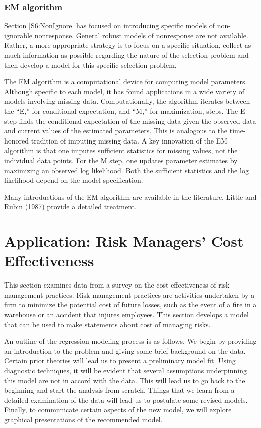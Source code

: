 \subsubsection*{EM algorithm}

Section \ref{S6:NonIgnore} has focused on introducing specific
models of non-ignorable nonresponse. General robust models of
nonresponse are not available. Rather, a more appropriate strategy
is to focus on a specific situation, collect as much information as
possible regarding the nature of the selection problem and then
develop a model for this specific selection problem.

The EM algorithm is a computational device for computing model
parameters. Although specific to each model, it has found
applications in a wide variety of models involving missing data.
Computationally, the algorithm iterates between the ``E,'' for
conditional expectation, and ``M,'' for maximization, steps. The E
step finds the conditional expectation of the missing data given the
observed data and current values of the estimated parameters. This
is analogous to the time-honored tradition of imputing missing data.
A key innovation of the EM algorithm is that one imputes sufficient
statistics for missing values, not the individual data points. For
the M step, one updates parameter estimates by maximizing an
observed log likelihood. Both the sufficient statistics and the log
likelihood depend on the model specification.

Many introductions of the EM algorithm are available in the
literature. Little and Rubin (1987) provide a detailed treatment.


\section{Application: Risk Managers' Cost Effectiveness}

This section examines data from a survey on the cost effectiveness
of risk management practices. Risk management practices are
activities undertaken by a firm to minimize the potential cost of
future losses, such as the event of a fire in a warehouse or an
accident that injures employees. This section develops a model that
can be used to make statements about cost of managing risks.

An outline of the regression modeling process is as follows. We
begin by providing an introduction to the problem and giving some
brief background on the data. Certain prior theories will lead us to
present a preliminary model fit. Using diagnostic techniques, it
will be evident that several assumptions underpinning this model are
not in accord with the data. This will lead us to go back to the
beginning and start the analysis from scratch. Things that we learn
from a detailed examination of the data will lead us to postulate
some revised models. Finally, to communicate certain aspects of the
new model, we will explore graphical presentations of the
recommended model.

